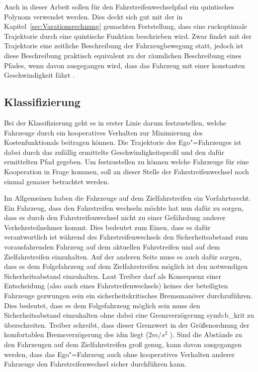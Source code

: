 Auch in dieser Arbeit sollen f\"ur den Fahrstreifenwechselpfad ein quintisches Polynom verwendet werden.
Dies deckt sich gut mit der in Kapitel~\ref{sec:Varationsrechnung} gemachten Feststellung, dass eine ruckoptimale Trajektorie durch eine quintische Funktion beschrieben wird.
Zwar findet mit der Trajektorie eine zeitliche Beschreibung der Fahrzeugbewegung statt, jedoch ist diese Beschreibung praktisch equivalent zu der r\"aumlichen Beschreibung eines Pfades, wenn davon ausgegangen wird, dass das Fahrzeug mit einer konstanten Geschwindigkeit f\"ahrt \cite{Mcnau2011}.



\subsection{Klassifizierung}
Bei der Klassifizierung geht es in erster Linie darum festzustellen, welche Fahrzeuge durch ein kooperatives Verhalten zur Minimierung des Kostenfunktionals beitragen k\"onnen.
Die Trajektorie des Ego"=Fahrzeuges ist dabei durch das zuf\"allig ermittelte Geschwindigkeitsprofil und den daf\"ur ermittelten Pfad gegeben.
Um festzustellen zu k\"onnen welche Fahrzeuge f\"ur eine Kooperation in Frage kommen, soll an dieser Stelle der Fahrstreifenwechsel noch einmal genauer betrachtet werden.

Im Allgemeinen haben die Fahrzeuge auf dem Zielfahrstreifen ein Vorfahrtsrecht.
Ein Fahrzeug, dass den Fahrstreifen wechseln m\"ochte hat nun daf\"ur zu sorgen, dass es durch den Fahrstreifenwechsel nicht zu einer Gef\"ahrdung anderer Verkehrsteilnehmer kommt.
Dies bedeutet zum Einen, dass es daf\"ur verantwortlich ist w\"ahrend des Fahrstreifenwechsels den Sicherheitsabstand zum vorausfahrenden Fahrzeug auf dem aktuellen Fahrstreifen und auf dem Zielfahrstreifen einzuhalten.
Auf der anderen Seite muss es auch daf\"ur sorgen, dass es dem Folgefahrzeug auf dem Zielfahrstreifen m\"oglich ist den notwendigen Sicherheitsabstand einzuhalten.
Laut Treiber \cite{Treiber2010} darf als Konsequenz einer Entscheidung (also auch eines Fahrstreifenwechsels) keines der beteiligten Fahrzeuge gezwungen sein ein sicherheitskritisches Bremsman\"over durchzuf\"uhren.
Dies bedeutet, dass es dem Folgefahrzeug m\"oglich sein muss den Sicherheitsabstand einzuhalten ohne dabei eine Grenzverz\"ogerung \gls{symb:b_krit} zu \"uberschreiten.
Treiber schreibt, dass dieser Grenzwert in der Gr\"o{\ss}enordnung der komfortablen Bremsverz\"ogerung des \gls{idm} liegt (\( 2 m/s^2 \) ).
Sind die Abst\"ande zu den Fahrzeugen auf dem Zielfahrstreifen gro{\ss} genug, kann davon ausgegangen werden, dass das Ego"=Fahrzeug auch ohne kooperatives Verhalten anderer Fahrzeuge den Fahrstreifenwechsel sicher durchf\"uhren kann.

